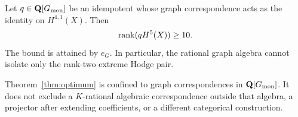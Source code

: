 \begin{theorem}
\label{thm:optimum}
Let \(q\in\mathbf Q[G_{\mathrm{mon}}]\) be an idempotent whose graph correspondence acts as
the identity on \(H^{4,1}(X)\).  Then
\[
 \operatorname{rank}(qH^5(X))\ge10.
\]
The bound is attained by \(e_G\).  In particular, the rational graph
algebra cannot isolate only the rank-two extreme Hodge pair.
\end{theorem}

Theorem~\ref{thm:optimum} is confined to graph correspondences in
\(\mathbf Q[G_{\mathrm{mon}}]\).  It does not exclude a \(K\)-rational algebraic
correspondence outside that algebra, a projector after extending
coefficients, or a different categorical construction.
